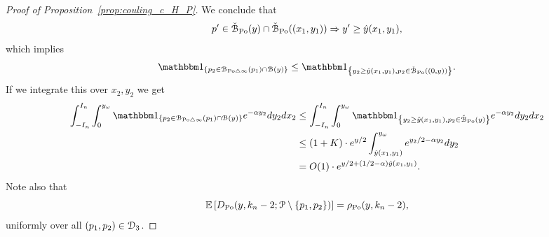 \begin{proof}[Proof of Proposition~\ref{prop:couling_c_H_P}]
We conclude that 
\begin{equation*}\label{eq:intersex_approx}
	p^\prime \in \check{{\mathcal B}}_{{\mathrm{Po}}}(y)\cap \check{{\mathcal B}}_{{\mathrm{Po}}}((x_1,y_1)) \Rightarrow y^\prime \ge \hat{y}(x_1,y_1),
\end{equation*}
which implies
\begin{equation} \label{eq:symdiff_loc}
\begin{split} 
 \ind{p_2 \in \BallSym{p_1}\cap \BallHyp{y}} \leq \ind{y_2 \geq \hat{y}(x_1,y_1), p_2 \in \FatBallHyp{(0,y)}}.
\end{split}
\end{equation}
If we integrate this over $x_2, y_2$ we get 
\begin{align*}
\int_{-I_n}^{I_n} \int_{0}^{y_\omega}  \ind{p_2 \in \BallSym{p_1}\cap \BallHyp{y}}  
e^{-\alpha y_2} dy_2 dx_2
&  \leq 
\int_{-I_n}^{I_n} \int_{0}^{y_\omega}  \ind{y_2 \geq \hat{y}(x_1,y_1), p_2 \in \FatBallHyp{y}}  
e^{-\alpha y_2} dy_2 dx_2 \\
&\leq (1+K) \cdot e^{y/2} \int_{\hat{y}(x_1,y_1)}^{y_\omega} e^{y_2/2 - \alpha y_2} dy_2 \\
&=O(1) \cdot e^{y/2 + (1/2 -\alpha) \hat{y}(x_1,y_1)}.
\end{align*}
Note also that 
\[
	\mathbb{E}\left[D_{{\mathrm{Po}}} (y,k_n-2;{\mathcal P} \setminus \{p_1, p_2\})\right] = \rho_{{\mathrm{Po}}}(y,k_n-2),
\]
uniformly over all $(p_1, p_2) \in \mathcal{D}_{3}$. 


\end{proof}
